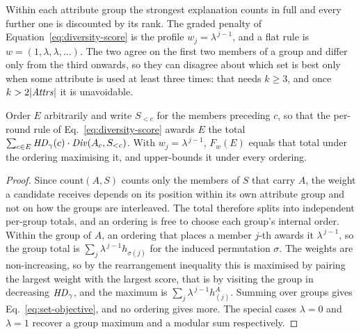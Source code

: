 Within each attribute group the strongest explanation counts in full and every further one is discounted by its rank.
The graded penalty of Equation~\eqref{eq:diversity-score} is the profile $w_j=\lambda^{\,j-1}$, and a flat rule is $w=(1,\lambda,\lambda,\dots)$.
The two agree on the first two members of a group and differ only from the third onwards, so they can disagree about which set is best only when some attribute is used at least three times: that needs $k\ge3$, and once $k>2|\mathit{Attrs}|$ it is unavoidable.

\begin{proposition}
\label{prop:setobj}
Order $E$ arbitrarily and write $S_{<c}$ for the members preceding $c$, so that the per-round rule of Eq.~\eqref{eq:diversity-score} awards $E$ the total $\sum_{c\in E}\mathit{HD}_\gamma(c)\cdot\mathit{Div}(A_c,S_{<c})$.
With $w_j=\lambda^{\,j-1}$, $F_w(E)$ equals that total under the ordering maximising it, and upper-bounds it under every ordering.
\end{proposition}

\begin{proof}
Since $\mathrm{count}(A,S)$ counts only the members of $S$ that carry $A$, the weight a candidate receives depends on its position within its own attribute group and not on how the groups are interleaved.
The total therefore splits into independent per-group totals, and an ordering is free to choose each group's internal order.
Within the group of $A$, an ordering that places a member $j$-th awards it $\lambda^{\,j-1}$, so the group total is $\sum_j \lambda^{\,j-1}h_{\sigma(j)}$ for the induced permutation $\sigma$.
The weights are non-increasing, so by the rearrangement inequality this is maximised by pairing the largest weight with the largest score, that is by visiting the group in decreasing $\mathit{HD}_\gamma$, and the maximum is $\sum_j \lambda^{\,j-1}h^A_{(j)}$.
Summing over groups gives Eq.~\eqref{eq:set-objective}, and no ordering gives more.
The special cases $\lambda=0$ and $\lambda=1$ recover a group maximum and a modular sum respectively.
\end{proof}


